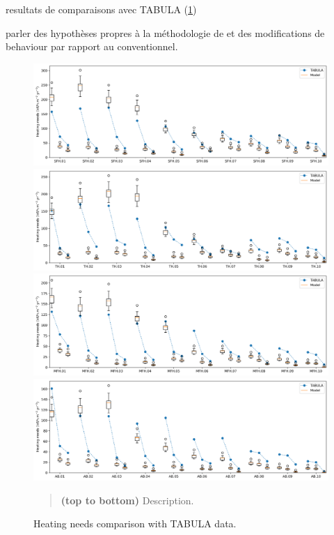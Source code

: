 \documentclass[11pt]{article}
\begin{document}
        resultats de comparaisons avec TABULA (\ref{fig:tabula_verif})

        parler des hypothèses propres à la méthodologie de \textcite{pouget_consultants_batiments_2015} et des modifications de behaviour par rapport au conventionnel. 

        \begin{figure}[ht]
            \centering
            \includegraphics[width=0.99\columnwidth]{figures/SFH_TABULA_consumption.png}
            \includegraphics[width=0.99\columnwidth]{figures/TH_TABULA_consumption.png}
            \includegraphics[width=0.99\columnwidth]{figures/MFH_TABULA_consumption.png}
            \includegraphics[width=0.99\columnwidth]{figures/AB_TABULA_consumption.png}
            \caption{\label{fig:tabula_verif} Heating needs comparison with TABULA data.}
                \begin{quote}
                    \vspace{-2mm}
                    \small\noindent
                    \textbf{(top to bottom)} Description. 
                \end{quote}
        \end{figure}  
\end{document}
